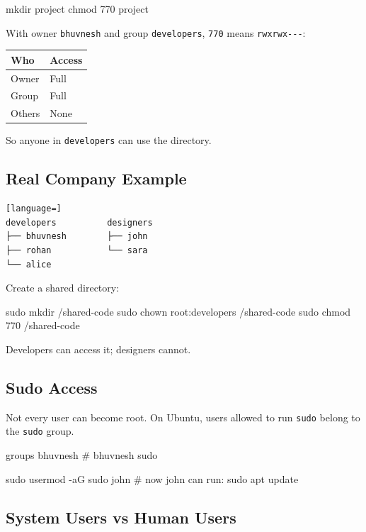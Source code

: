 \documentclass[11pt,a4paper]{article}
\begin{document}
\begin{sh}
mkdir project
chmod 770 project
\end{sh}

With owner \texttt{bhuvnesh} and group \texttt{developers}, \lstinline|770| means
\lstinline|rwxrwx---|:

\begin{center}
\small
\begin{tabular}{@{}l l@{}}
\toprule
\rowcolor{tablehead}\bfseries Who & \bfseries Access \\
\midrule
Owner  & Full \\
Group  & Full \\
Others & None \\
\bottomrule
\end{tabular}
\end{center}

So anyone in \texttt{developers} can use the directory.

\subsection{Real Company Example}

\begin{lstlisting}[language=]
developers          designers
├── bhuvnesh        ├── john
├── rohan           └── sara
└── alice
\end{lstlisting}

Create a shared directory:

\begin{sh}
sudo mkdir /shared-code
sudo chown root:developers /shared-code
sudo chmod 770 /shared-code
\end{sh}

Developers can access it; designers cannot.

\subsection{Sudo Access}

Not every user can become root. On Ubuntu, users allowed to run \lstinline|sudo| belong to
the \texttt{sudo} group.

\begin{sh}
groups bhuvnesh
# bhuvnesh sudo

sudo usermod -aG sudo john   # now john can run: sudo apt update
\end{sh}

\subsection{System Users vs Human Users}
\end{document}
